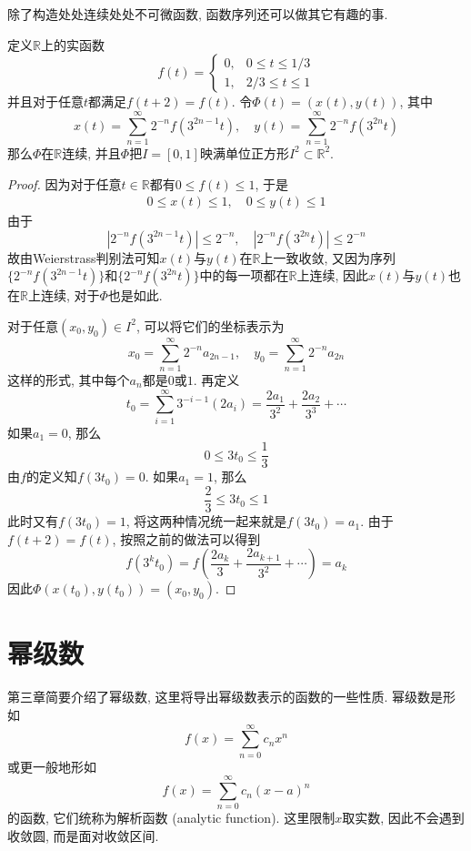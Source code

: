 \documentclass[cn,12pt,math=mtpro2,citestyle=gb7714-2015,bibstyle=gb7714-2015,twocol]{elegantbook}
\newcommand{\R}{\mathbb{R}}
\begin{document}
除了构造处处连续处处不可微函数, 函数序列还可以做其它有趣的事.
\begin{example}
定义$\R$上的实函数
$$f(t)=\begin{cases}
         0, & 0\leq t\leq \displaystyle1/3 \\
         1, & 2/3\leq t\leq 1
       \end{cases}$$
并且对于任意$t$都满足$f(t+2)=f(t)$.  令$\Phi(t)=(x(t),y(t))$, 其中
$$x(t)=\sum_{n=1}^{\infty}2^{-n}f(3^{2n-1}t),\quad y(t)=\sum_{n=1}^{\infty}2^{-n}f(3^{2n}t)$$
那么$\Phi$在$\R$连续, 并且$\Phi$把$I=[0,1]$映满单位正方形$I^2\subset\R^2$.
\end{example}
\begin{proof}
  因为对于任意$t\in\R$都有$0\leq f(t)\leq 1$, 于是
  \begin{align*}
0\leq x(t)\leq 1,\quad 0\leq y(t)\leq 1
  \end{align*}
  由于
  $$\left|2^{-n}f(3^{2n-1}t)\right|\leq 2^{-n},\quad \left|2^{-n}f(3^{2n}t)\right|\leq 2^{-n}$$
  故由Weierstrass判别法可知$x(t)$与$y(t)$在$\R$上一致收敛, 又因为序列$\{2^{-n}f(3^{2n-1}t)\}$和$\{2^{-n}f(3^{2n}t)\}$中的每一项都在$\R$上连续, 因此$x(t)$与$y(t)$也在$\R$上连续, 对于$\Phi$也是如此.

  对于任意$(x_0,y_0)\in I^2$, 可以将它们的坐标表示为
  $$x_0=\sum_{n=1}^{\infty}2^{-n}a_{2n-1},\quad y_0=\sum_{n=1}^{\infty}2^{-n}a_{2n}$$
  这样的形式, 其中每个$a_n$都是$0$或$1$. 再定义
  $$t_0=\sum_{i=1}^{\infty}3^{-i-1}(2a_i)=\frac{2a_1}{3^2}+\frac{2a_2}{3^3}+\cdots$$
  如果$a_1=0$, 那么
  $$0\leq 3t_0\leq \frac{1}{3}$$
  由$f$的定义知$f(3t_0)=0$. 如果$a_1=1$, 那么
  $$\frac{2}{3}\leq 3t_0\leq 1$$
  此时又有$f(3t_0)=1$, 将这两种情况统一起来就是$f(3t_0)=a_1$. 由于$f(t+2)=f(t)$, 按照之前的做法可以得到
  $$f(3^kt_0)=f\left(\frac{2a_k}{3}+\frac{2a_{k+1}}{3^2}+\cdots\right)=a_k$$
  因此$\Phi(x(t_0),y(t_0))=(x_0,y_0)$.
\end{proof}
\section{幂级数}
第三章简要介绍了幂级数, 这里将导出幂级数表示的函数的一些性质. 幂级数是形如
\begin{equation}\label{eq8.1}
  f(x)=\sum_{n=0}^{\infty}c_nx^n
\end{equation}
或更一般地形如
\begin{equation}\label{eq8.2}
  f(x)=\sum_{n=0}^{\infty}c_n(x-a)^n
\end{equation}
的函数, 它们统称为解析函数 (analytic function). 这里限制$x$取实数, 因此不会遇到收敛圆, 而是面对收敛区间.
\end{document}
